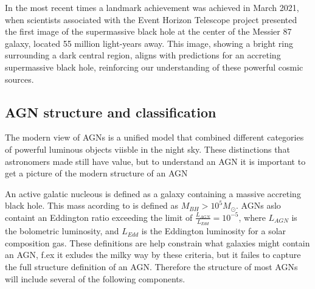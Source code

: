 \documentclass{article}
\begin{document}
In the most recent times a landmark achievement was achieved in March 2021, when scientists associated with the Event Horizon Telescope project 
presented the first image of the supermassive black hole at the center of the Messier 87 galaxy, located 55 million light-years away.
This image, showing a bright ring surrounding a dark central region, aligns with predictions for an accreting supermassive black hole, 
reinforcing our understanding of these powerful cosmic sources.



\subsection{AGN structure and classification}


The modern view of AGNs is a unified model that combined different categories of powerful luminous objects viisble in the night sky.
These distinctions that astronomers made still
have value, but to understand an AGN it is important to get a picture of the modern structure of an AGN

An active galatic nucleous is defined as a galaxy containing a massive accreting black hole. This mass acording to \cite{Netzer_2015} 
is defined as $M_{BH} > 10^5 M_\odot$. AGNs aslo containt an Eddington ratio exceeding
the limit of $\frac{L_{AGN}}{L_{Edd}} = 10^{-5}$, where $L_{AGN}$ is the bolometric luminosity, and $L_{Edd}$ is the Eddington luminosity for a solar 
composition gas. These definitions are help constrain what galaxies might contain an AGN, f.ex it exludes the milky way 
by these criteria, but it failes to capture the full structure definition of an AGN. 
Therefore the structure of most AGNs will include several of the following components. 
\end{document}

